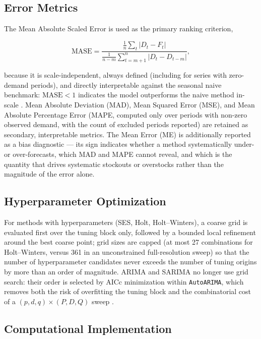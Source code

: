 \documentclass[forecasting,article,submit,pdftex,moreauthors]{Definitions/mdpi}
\begin{document}
\subsection{Error Metrics}
\label{sec:metrics}

The Mean Absolute Scaled Error is used as the primary ranking criterion,
\begin{linenomath}
\begin{equation}
\mathrm{MASE} = \frac{\frac{1}{n}\sum_{t}|D_t - F_t|}{\frac{1}{n-m}\sum_{t=m+1}^{n}|D_t - D_{t-m}|},
\end{equation}
\end{linenomath}
because it is scale-independent, always defined (including for series with zero-demand periods), and directly interpretable against the seasonal naive benchmark: $\mathrm{MASE}<1$ indicates the model outperforms the naive method in-scale \cite{hyndmankoehler2006}. Mean Absolute Deviation (MAD), Mean Squared Error (MSE), and Mean Absolute Percentage Error (MAPE, computed only over periods with non-zero observed demand, with the count of excluded periods reported) are retained as secondary, interpretable metrics. The Mean Error (ME) is additionally reported as a bias diagnostic --- its sign indicates whether a method systematically under- or over-forecasts, which MAD and MAPE cannot reveal, and which is the quantity that drives systematic stockouts or overstocks rather than the magnitude of the error alone.

\subsection{Hyperparameter Optimization}
\label{sec:hyperopt}

For methods with hyperparameters (SES, Holt, Holt--Winters), a coarse grid is evaluated first over the tuning block only, followed by a bounded local refinement around the best coarse point; grid sizes are capped (at most 27 combinations for Holt--Winters, versus 361 in an unconstrained full-resolution sweep) so that the number of hyperparameter candidates never exceeds the number of tuning origins by more than an order of magnitude. ARIMA and SARIMA no longer use grid search: their order is selected by AICc minimization within \texttt{AutoARIMA}, which removes both the risk of overfitting the tuning block and the combinatorial cost of a $(p,d,q)\times(P,D,Q)$ sweep \cite{hyndmankhandakar2008}.

\subsection{Computational Implementation}
\label{sec:implementation}
\end{document}
